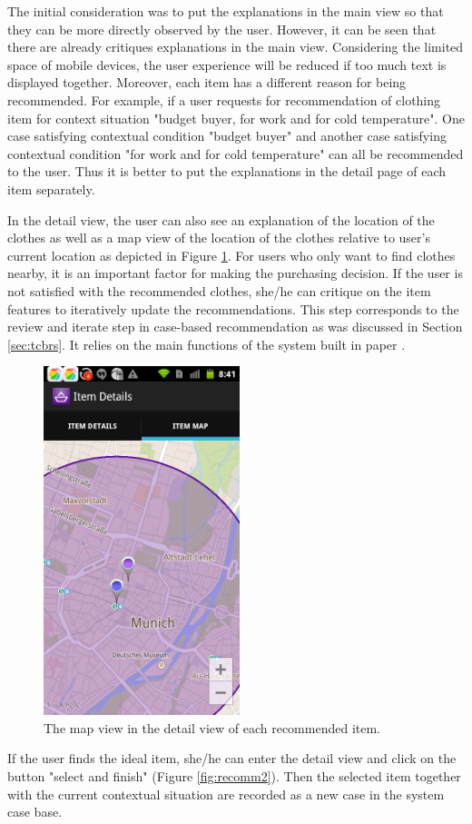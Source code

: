 The initial consideration was to put the explanations in the main view so that they can be more directly observed by the user. However, it can be seen that there are already critiques explanations in the main view. Considering the limited space of mobile devices, the user experience will be reduced if too much text is displayed together. Moreover, each item has a different reason for being recommended. For example, if a user requests for recommendation of clothing item for context situation "budget buyer, for work and for cold temperature". One case satisfying contextual condition "budget buyer" and another case satisfying contextual condition "for work and for cold temperature" can all be recommended to the user. Thus it is better to put the explanations in the detail page of each item separately.

In the detail view, the user can also see an explanation of the location of the clothes as well as a map view of the location of the clothes relative to user's current location as depicted in Figure \ref{fig:detailmap}. For users who only want to find clothes nearby, it is an important factor for making the purchasing decision. If the user is not satisfied with the recommended clothes, she/he can critique on the item features to iteratively update the recommendations. This step corresponds to the review and iterate step in case-based recommendation as was discussed in Section \ref{sec:tcbrs}. It relies on the main functions of the system built in paper \cite{ref:30}.

\begin{figure}[H]
	\centering
	\includegraphics[height=4in]{figures/recommdetailmap.png}
	\caption{The map view in the detail view of each recommended item.}
	\label{fig:detailmap}
\end{figure}

If the user finds the ideal item, she/he can enter the detail view and click on the button "select and finish" (Figure \ref{fig:recomm2}). Then the selected item together with the current contextual situation are recorded as a new case in the system case base. 




















